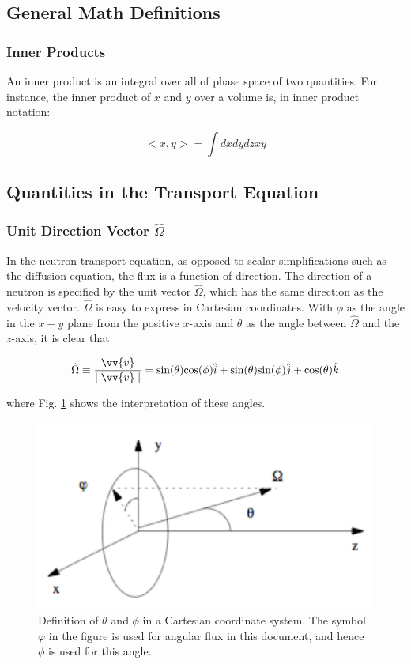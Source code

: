 \documentclass[10pt]{article}
\begin{document}
\begin{flushleft}
\subsection{General Math Definitions}

\subsubsection{Inner Products}

An inner product is an integral over all of phase space of two quantities. For instance, the inner product of \(x\) and \(y\) over a volume is, in inner product notation:

\begin{equation}
\label{eq:innerproduct}
< x, y > = \int dxdydz xy
\end{equation}

\subsection{Quantities in the Transport Equation}

\subsubsection{Unit Direction Vector \(\hat{\Omega}\)}

In the neutron transport equation, as opposed to scalar simplifications such as the diffusion equation, the flux is a function of direction. The direction of a neutron is specified by the unit vector \(\hat{\Omega}\), which has the same direction as the velocity vector. \(\hat{\Omega}\) is easy to express in Cartesian coordinates. With \(\phi\) as the angle in the \(x-y\) plane from the positive \(x\)-axis and \(\theta\) as the angle between \(\hat{\Omega}\) and the \(z\)-axis, it is clear that

\begin{equation}
\label{eq:OmegaCartesian}
\hat{\Omega} \equiv \frac{\vv{v}}{\mid \vv{v}\mid} = \textrm{sin}(\theta)\textrm{cos}(\phi)\hat{i} + \textrm{sin}(\theta)\textrm{sin}(\phi)\hat{j} + \textrm{cos}(\theta)\hat{k}
\end{equation}

where Fig. \ref{fig:CartesianOmegaHat} shows the interpretation of these angles.

\begin{figure}[H]
\centering
\includegraphics[width=0.4\linewidth]{figures/CartesianOmegaHat.png}
\caption{Definition of \(\theta\) and \(\phi\) in a Cartesian coordinate system. The symbol \(\varphi\) in the figure is used for angular flux in this document, and hence \(\phi\) is used for this angle.}
\label{fig:CartesianOmegaHat}
\end{figure}


\end{flushleft}
\end{document}
